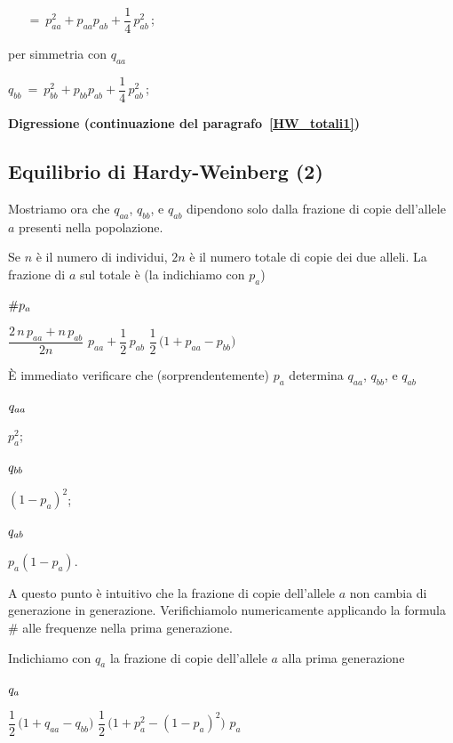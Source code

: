 \documentclass[11pt,openany]{book}
\begin{document}
$\phantom{q_{aa}}\ =\ p_{aa}^2+p_{aa}p_{ab} +\dfrac{1}{4}\,p^2_{ab}\,$;

% 
% 
% 

per simmetria con $q_{aa}$

$q_{bb}\ =\ p_{bb}^2+p_{bb}p_{ab} +\dfrac{1}{4}\,p^2_{ab}\,$;


\clearpage\hfill\textbf{Digressione (continuazione del paragrafo~\ref{HW_totali1})}\subsection{Equilibrio di Hardy-Weinberg (2)}

\def\ceq#1#2#3{\parbox{12ex}{$\displaystyle #1$}\medrel{#2}$\displaystyle  #3$}

Mostriamo ora che $q_{aa}$, $q_{bb}$, e $q_{ab}$ dipendono solo dalla frazione di copie dell'allele $a$ presenti nella popolazione. 

Se $n$ \`e il numero di individui, $2n$ è il numero totale di copie dei due alleli. La frazione di $a$ sul totale è (la indichiamo con $p_a$)

\ceq{\#\hfill p_a}{=}{\dfrac{2\,n\,p_{aa}+n\,p_{ab}}{2n}}
\medrel{=}$p_{aa}+\dfrac12\,p_{ab}$
\medrel{=}$\dfrac12\,\big(1+p_{aa}-p_{bb}\big)$

È immediato verificare che (sorprendentemente) $p_a$ determina  $q_{aa}$, $q_{bb}$, e $q_{ab}$

\ceq{\hfill q_{aa}}{=}{p_a^2};
\ceq{\hfill q_{bb}}{=}{(1-p_a)^2};
\ceq{\hfill q_{ab}}{=}{p_a(1-p_a)}.

A questo punto è intuitivo che la frazione di copie dell'allele $a$ non cambia di generazione in generazione. Verifichiamolo numericamente applicando la formula $\#$ alle frequenze nella prima generazione.

Indichiamo con $q_a$ la frazione di copie dell'allele $a$ alla prima generazione

\ceq{\hfill q_a}{=}{\dfrac12\,\big(1+q_{aa}-q_{bb}\big)}
\medrel{=}$\dfrac12\,\big(1+p^2_{a}-(1-p_{a})^2\big)$
\medrel{=}$p_a$
\end{document}

